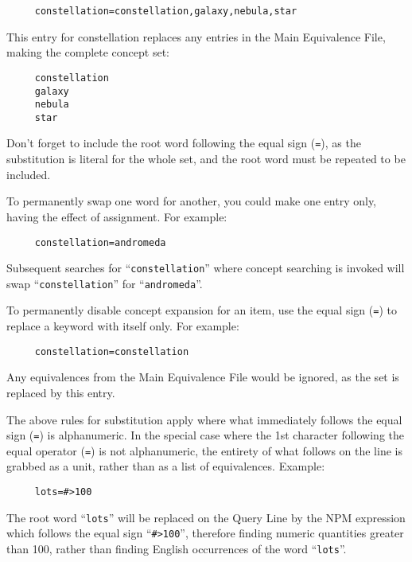 \begin{verbatim}
     constellation=constellation,galaxy,nebula,star
\end{verbatim}

This entry for constellation replaces any entries in the Main
Equivalence File, making the complete concept set:

\begin{verbatim}
     constellation
     galaxy
     nebula
     star
\end{verbatim}

Don't forget to include the root word following the equal sign
(\verb`=`), as the substitution is literal for the whole set, and the
root word must be repeated to be included.

To permanently swap one word for another, you could make one entry
only, having the effect of assignment.  For example:

\begin{verbatim}
     constellation=andromeda
\end{verbatim}

Subsequent searches for ``\verb`constellation`'' where concept
searching is invoked will swap ``\verb`constellation`'' for
``\verb`andromeda`''.

To permanently disable concept expansion for an item, use the equal
sign (\verb`=`) to replace a keyword with itself only.  For example:

\begin{verbatim}
     constellation=constellation
\end{verbatim}

Any equivalences from the Main Equivalence File would be ignored, as
the set is replaced by this entry.

The above rules for substitution apply where what immediately follows
the equal sign (\verb`=`) is alphanumeric.  In the special case where
the 1st character following the equal operator (\verb`=`) is not
alphanumeric, the entirety of what follows on the line is grabbed as a
unit, rather than as a list of equivalences.  Example:

\begin{verbatim}
     lots=#>100
\end{verbatim}

The root word ``\verb`lots`'' will be replaced on the Query Line by
the NPM expression which follows the equal sign ``\verb`#>100`'',
therefore finding numeric quantities greater than 100, rather than
finding English occurrences of the word ``\verb`lots`''.

